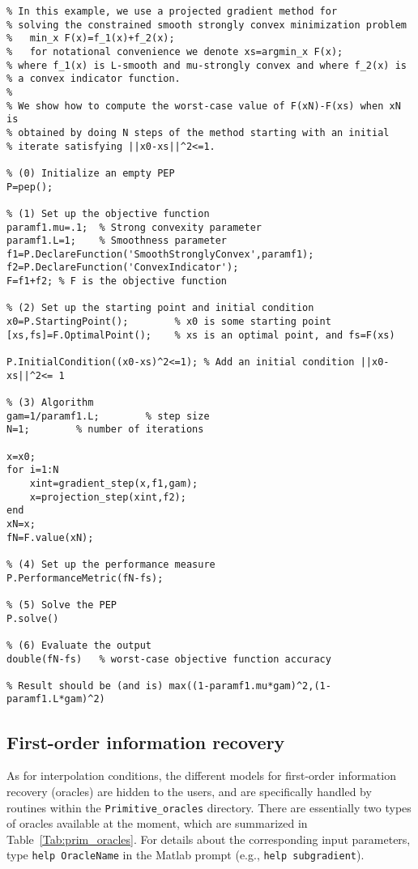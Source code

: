 \documentclass[11pt,a4paper]{article}
\begin{document}
		\begin{lstlisting}
% In this example, we use a projected gradient method for
% solving the constrained smooth strongly convex minimization problem
%   min_x F(x)=f_1(x)+f_2(x);
%   for notational convenience we denote xs=argmin_x F(x);
% where f_1(x) is L-smooth and mu-strongly convex and where f_2(x) is
% a convex indicator function.
%
% We show how to compute the worst-case value of F(xN)-F(xs) when xN is
% obtained by doing N steps of the method starting with an initial
% iterate satisfying ||x0-xs||^2<=1.

% (0) Initialize an empty PEP
P=pep();

% (1) Set up the objective function
paramf1.mu=.1;	% Strong convexity parameter
paramf1.L=1;    % Smoothness parameter
f1=P.DeclareFunction('SmoothStronglyConvex',paramf1);
f2=P.DeclareFunction('ConvexIndicator');
F=f1+f2; % F is the objective function

% (2) Set up the starting point and initial condition
x0=P.StartingPoint();		 % x0 is some starting point
[xs,fs]=F.OptimalPoint(); 	 % xs is an optimal point, and fs=F(xs)

P.InitialCondition((x0-xs)^2<=1); % Add an initial condition ||x0-xs||^2<= 1

% (3) Algorithm
gam=1/paramf1.L;		% step size
N=1;		% number of iterations

x=x0;
for i=1:N
	xint=gradient_step(x,f1,gam);
	x=projection_step(xint,f2);
end
xN=x;
fN=F.value(xN);

% (4) Set up the performance measure
P.PerformanceMetric(fN-fs);

% (5) Solve the PEP
P.solve()

% (6) Evaluate the output
double(fN-fs)   % worst-case objective function accuracy

% Result should be (and is) max((1-paramf1.mu*gam)^2,(1-paramf1.L*gam)^2)
		\end{lstlisting}
		\newpage
		\subsection{First-order information recovery}\label{sec:oracles}
		As for interpolation conditions, the different models for first-order information recovery (oracles) are hidden to the users, and are specifically handled by routines within the \verb?Primitive_oracles? directory. There are essentially two types of oracles available at the moment, which are summarized in Table~\ref{Tab:prim_oracles}.  For details about the corresponding input parameters, type \verb?help OracleName? in the Matlab prompt (e.g., \verb?help subgradient?).
\end{document}
